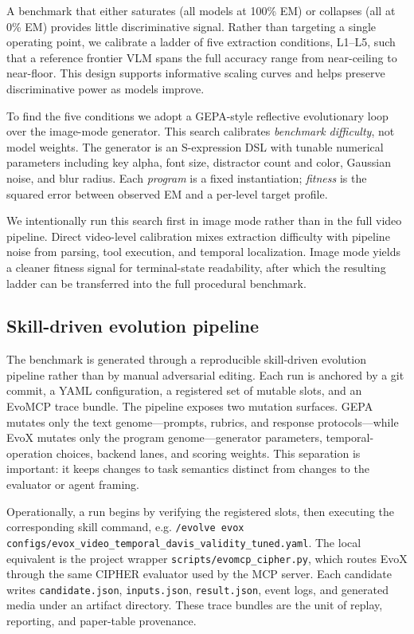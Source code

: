 A benchmark that either saturates (all models at 100\% EM) or collapses (all
at 0\% EM) provides little discriminative signal. Rather than targeting a
single operating point, we calibrate a ladder of five extraction conditions,
L1--L5, such that a reference frontier VLM spans the full accuracy range from
near-ceiling to near-floor. This design supports informative scaling curves and
helps preserve discriminative power as models improve.

To find the five conditions we adopt a GEPA-style \citep{gepa} reflective
evolutionary loop over the image-mode generator. This search calibrates
\emph{benchmark difficulty}, not model weights. The generator is an
S-expression DSL with tunable numerical parameters including key alpha, font
size, distractor count and color, Gaussian noise, and blur radius. Each
\emph{program} is a fixed instantiation; \emph{fitness} is the squared error
between observed EM and a per-level target profile.

We intentionally run this search first in image mode rather than in the full
video pipeline. Direct video-level calibration mixes extraction difficulty with
pipeline noise from parsing, tool execution, and temporal localization. Image
mode yields a cleaner fitness signal for terminal-state readability, after
which the resulting ladder can be transferred into the full procedural
benchmark.

\subsection{Skill-driven evolution pipeline}
\label{sec:skill-pipeline}

The benchmark is generated through a reproducible skill-driven evolution
pipeline rather than by manual adversarial editing. Each run is anchored by a
git commit, a YAML configuration, a registered set of mutable slots, and an
EvoMCP trace bundle. The pipeline exposes two mutation surfaces. GEPA mutates
only the text genome---prompts, rubrics, and response protocols---while EvoX
mutates only the program genome---generator parameters, temporal-operation
choices, backend lanes, and scoring weights. This separation is important: it
keeps changes to task semantics distinct from changes to the evaluator or
agent framing.

Operationally, a run begins by verifying the registered slots, then executing
the corresponding skill command, e.g. \texttt{/evolve evox
configs/evox\_video\_temporal\_davis\_validity\_tuned.yaml}. The local
equivalent is the project wrapper
\texttt{scripts/evomcp\_cipher.py}, which routes EvoX through the same CIPHER
evaluator used by the MCP server. Each candidate writes
\texttt{candidate.json}, \texttt{inputs.json}, \texttt{result.json}, event
logs, and generated media under an artifact directory. These trace bundles are
the unit of replay, reporting, and paper-table provenance.

